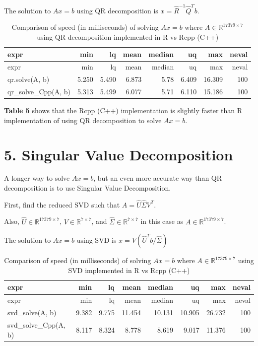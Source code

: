 \documentclass[
]{article}
\begin{document}
The solution to \(Ax = b\) using QR decomposition is
\(x = \hat{R}^{-1}\hat{Q}^{T}b\).

\begin{longtable}[]{@{}lrrrrrrr@{}}
\caption{Comparison of speed (in milliseconds) of solving \(Ax = b\)
where \(A \in \mathbb{R}^{17379 \times 7}\) using QR decomposition
implemented in R vs Rcpp (C++)}\tabularnewline
\toprule
expr & min & lq & mean & median & uq & max & neval\tabularnewline
\midrule
\endfirsthead
\toprule
expr & min & lq & mean & median & uq & max & neval\tabularnewline
\midrule
\endhead
qr.solve(A, b) & 5.250 & 5.490 & 6.873 & 5.78 & 6.409 & 16.309 &
100\tabularnewline
qr\_solve\_Cpp(A, b) & 5.313 & 5.499 & 6.077 & 5.71 & 6.110 & 15.186 &
100\tabularnewline
\bottomrule
\end{longtable}

\textbf{Table 5} shows that the Rcpp (C++) implementation is slightly
faster than R implementation of using QR decomposition to solve
\(Ax = b\).

\hypertarget{singular-value-decomposition}{%
\section{5. Singular Value
Decomposition}\label{singular-value-decomposition}}

A longer way to solve \(Ax = b\), but an even more accurate way than QR
decomposition is to use Singular Value Decomposition.

First, find the reduced SVD such that \(A = \hat{U}\hat{\Sigma}V^{T}\).

Also, \(\hat{U} \in \mathbb{R}^{17379 \times 7}\),
\(V \in \mathbb{R}^{7 \times 7}\), and
\(\hat{\Sigma} \in \mathbb{R}^{7 \times 7}\) in this case as
\(A \in \mathbb{R}^{17379 \times 7}\).

The solution to \(Ax = b\) using SVD is
\(x = V(\hat{U}^{T}b/\hat{\Sigma})\)

\begin{longtable}[]{@{}lrrrrrrr@{}}
\caption{Comparison of speed (in milliseconds) of solving \(Ax = b\)
where \(A \in \mathbb{R}^{17379 \times 7}\) using SVD implemented in R
vs Rcpp (C++)}\tabularnewline
\toprule
expr & min & lq & mean & median & uq & max & neval\tabularnewline
\midrule
\endfirsthead
\toprule
expr & min & lq & mean & median & uq & max & neval\tabularnewline
\midrule
\endhead
svd\_solve(A, b) & 9.382 & 9.775 & 11.454 & 10.131 & 10.905 & 26.732 &
100\tabularnewline
svd\_solve\_Cpp(A, b) & 8.117 & 8.324 & 8.778 & 8.619 & 9.017 & 11.376 &
100\tabularnewline
\bottomrule
\end{longtable}
\end{document}

